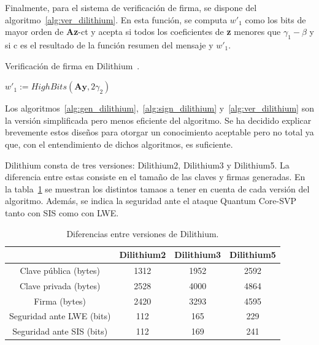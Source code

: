 Finalmente, para el sistema de verificación de firma, se dispone del algoritmo~\ref{alg:ver_dilithium}.
En esta función, se computa ${w'}_1$ como los bits de mayor orden de \textbf{Az}-ct y acepta si todos los coeficientes de \textbf{z} menores que $\gamma_1 - \beta$ y si c es el resultado de la función resumen del mensaje y ${w'}_1$.

\begin{algorithm}
    \caption{Verificación de firma en Dilithium~\cite{dilithium_spec}.}
    \label{alg:ver_dilithium}
    \hspace{2mm}${w'}_1 := HighBits(\textbf{Ay}, 2\gamma_2)$\newline
\end{algorithm}

Los algoritmos~\ref{alg:gen_dilithium},~\ref{alg:sign_dilithium} y~\ref{alg:ver_dilithium} son la versión simplificada pero menos eficiente del algoritmo.
Se ha decidido explicar brevemente estos diseños para otorgar un conocimiento aceptable pero no total ya que, con el entendimiento de dichos algoritmos, es suficiente.

Dilithium consta de tres versiones: Dilithium2, Dilithium3 y Dilithium5.
La diferencia entre estas consiste en el tamaño de las claves y firmas generadas.
En la tabla~\ref{tab:dilithium} se muestran los distintos tamaos a tener en cuenta de cada versión del algoritmo.
Además, se indica la seguridad ante el ataque Quantum Core-SVP tanto con \ac{SIS} como con \ac{LWE}.

\begin{table}[H]
    \centering
    \begin{tabular}{|c|c|c|c|}
    \hline
                            & \textbf{Dilithium2}   & \textbf{Dilithium3}   & \textbf{Dilithium5}   \\ \hline
    Clave pública (bytes)   & 1312                  & 1952                  & 2592                  \\ \hline
    Clave privada (bytes)   & 2528                  & 4000                  & 4864                  \\ \hline
    Firma (bytes)           & 2420                  & 3293                  & 4595                  \\ \hline
    Seguridad ante LWE (bits) & 112                 & 165                   & 229                   \\ \hline
    Seguridad ante SIS (bits) & 112                 & 169                   & 241                   \\ \hline
    \end{tabular}
    \caption{Diferencias entre versiones de Dilithium.}
    \label{tab:dilithium}
\end{table}



